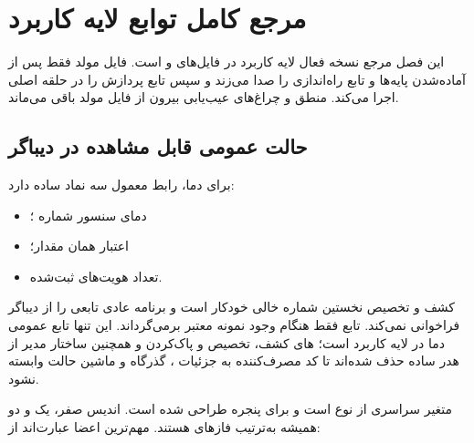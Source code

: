 \chapter{مرجع کامل توابع لایه کاربرد}

این فصل مرجع نسخه فعال لایه کاربرد در فایل‌های
و
است. فایل مولد
فقط پس از آماده‌شدن پایه‌ها و
تابع راه‌اندازی را صدا می‌زند و سپس تابع پردازش را در حلقه اصلی اجرا می‌کند. منطق
و چراغ‌های عیب‌یابی بیرون از فایل مولد باقی می‌ماند.

\section{حالت عمومی قابل مشاهده در دیباگر}
برای دما، رابط معمول سه نماد ساده دارد:
\begin{itemize}
  \item {} دمای سنسور شماره ؛
  \item {} اعتبار همان مقدار؛
  \item {} تعداد هویت‌های ثبت‌شده.
\end{itemize}
کشف و تخصیص نخستین شماره خالی خودکار است و برنامه عادی تابعی را از دیباگر فراخوانی نمی‌کند. تابع  فقط هنگام وجود نمونه معتبر  برمی‌گرداند.
این تنها تابع عمومی دما در لایه کاربرد است؛ های کشف، تخصیص و پاک‌کردن و همچنین ساختار مدیر از هدر ساده حذف شده‌اند تا کد مصرف‌کننده به جزئیات ، گذرگاه و ماشین حالت وابسته نشود.

متغیر سراسری
از نوع
است و برای پنجره
طراحی شده است. اندیس صفر، یک و دو همیشه به‌ترتیب فازهای
هستند. مهم‌ترین اعضا عبارت‌اند از:


